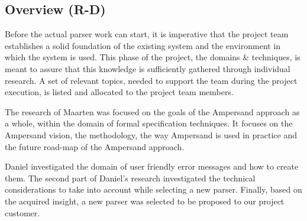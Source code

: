 
\subsection{Overview (R-D)}
\label{domain:overview}
Before the actual parser work can start, it is imperative that the project team establishes a solid foundation of the existing system and the environment in which the system is used.
This phase of the project, the domains \& techniques, is meant to assure that this knowledge is sufficiently gathered through individual research.
A set of relevant topics, needed to support the team during the project execution, is listed and allocated to the project team members.

The research of Maarten was focused on the goals of the Ampersand approach as a whole, within the domain of formal specification techniques.
It focuses on the Ampersand vision, the methodology, the way Ampersand is used in practice and the future road-map of the Ampersand approach.

Daniel investigated the domain of user friendly error messages and how to create them.
The second part of Daniel's research investigated the technical considerations to take into account while selecting a new parser.
Finally, based on the acquired insight, a new parser was selected to be proposed to our project customer.